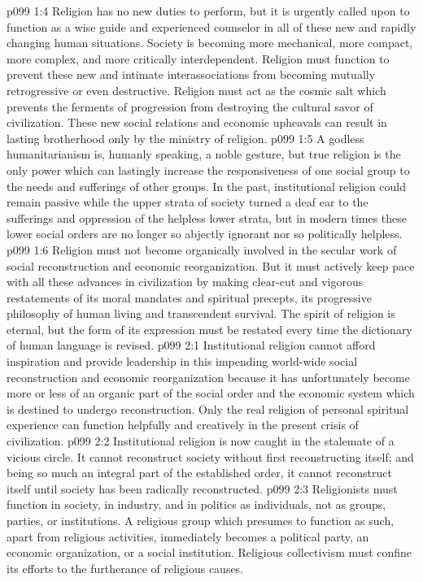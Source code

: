 \vs p099 1:4 Religion has no new duties to perform, but it is urgently called upon to function as a wise guide and experienced counselor in all of these new and rapidly changing human situations. Society is becoming more mechanical, more compact, more complex, and more critically interdependent. Religion must function to prevent these new and intimate interassociations from becoming mutually retrogressive or even destructive. Religion must act as the cosmic salt which prevents the ferments of progression from destroying the cultural savor of civilization. These new social relations and economic upheavals can result in lasting brotherhood only by the ministry of religion.
\vs p099 1:5 A godless humanitarianism is, humanly speaking, a noble gesture, but true religion is the only power which can lastingly increase the responsiveness of one social group to the needs and sufferings of other groups. In the past, institutional religion could remain passive while the upper strata of society turned a deaf ear to the sufferings and oppression of the helpless lower strata, but in modern times these lower social orders are no longer so abjectly ignorant nor so politically helpless.
\vs p099 1:6 Religion must not become organically involved in the secular work of social reconstruction and economic reorganization. But it must actively keep pace with all these advances in civilization by making clear\hyp{}cut and vigorous restatements of its moral mandates and spiritual precepts, its progressive philosophy of human living and transcendent survival. The spirit of religion is eternal, but the form of its expression must be restated every time the dictionary of human language is revised.
\vs p099 2:1 Institutional religion cannot afford inspiration and provide leadership in this impending world\hyp{}wide social reconstruction and economic reorganization because it has unfortunately become more or less of an organic part of the social order and the economic system which is destined to undergo reconstruction. Only the real religion of personal spiritual experience can function helpfully and creatively in the present crisis of civilization.
\vs p099 2:2 Institutional religion is now caught in the stalemate of a vicious circle. It cannot reconstruct society without first reconstructing itself; and being so much an integral part of the established order, it cannot reconstruct itself until society has been radically reconstructed.
\vs p099 2:3 \pc Religionists must function in society, in industry, and in politics as individuals, not as groups, parties, or institutions. A religious group which presumes to function as such, apart from religious activities, immediately becomes a political party, an economic organization, or a social institution. Religious collectivism must confine its efforts to the furtherance of religious causes.

